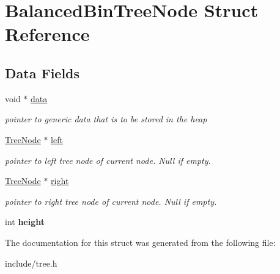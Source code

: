 \hypertarget{struct_balanced_bin_tree_node}{}\section{Balanced\+Bin\+Tree\+Node Struct Reference}
\label{struct_balanced_bin_tree_node}
\subsection*{Data Fields}
\begin{DoxyCompactItemize}
\item 
\mbox{\label{struct_balanced_bin_tree_node_a735984d41155bc1032e09bece8f8d66d}} 
void $\ast$ \hyperlink{struct_balanced_bin_tree_node_a735984d41155bc1032e09bece8f8d66d}{data}
\begin{DoxyCompactList}\small\item\em pointer to generic data that is to be stored in the heap \end{DoxyCompactList}\item 
\mbox{\label{struct_balanced_bin_tree_node_ae8d322b6ea2cf85addc4c1bc2955aec8}} 
\hyperlink{struct_balanced_bin_tree_node}{Tree\+Node} $\ast$ \hyperlink{struct_balanced_bin_tree_node_ae8d322b6ea2cf85addc4c1bc2955aec8}{left}
\begin{DoxyCompactList}\small\item\em pointer to left tree node of current node. Null if empty. \end{DoxyCompactList}\item 
\mbox{\label{struct_balanced_bin_tree_node_a3da97ee7c26ca3a082355a71c0f776a9}} 
\hyperlink{struct_balanced_bin_tree_node}{Tree\+Node} $\ast$ \hyperlink{struct_balanced_bin_tree_node_a3da97ee7c26ca3a082355a71c0f776a9}{right}
\begin{DoxyCompactList}\small\item\em pointer to right tree node of current node. Null if empty. \end{DoxyCompactList}\item 
\mbox{\label{struct_balanced_bin_tree_node_ad12fc34ce789bce6c8a05d8a17138534}} 
int {\bfseries height}
\end{DoxyCompactItemize}


The documentation for this struct was generated from the following file\+:\begin{DoxyCompactItemize}
\item 
include/tree.\+h\end{DoxyCompactItemize}
